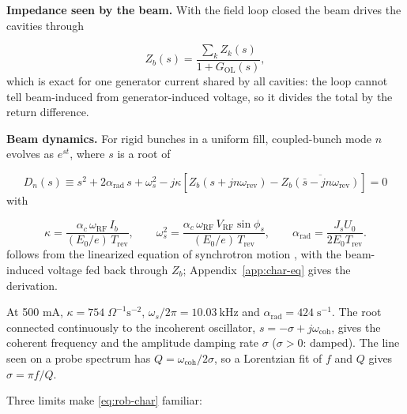 \textbf{Impedance seen by the beam.} With the field loop closed the beam drives the cavities through

\begin{equation}\label{eq:rob-zb}
Z_b(s) = \frac{\sum_k Z_k(s)}{1 + G_\text{OL}(s)},
\end{equation}
which is exact for one generator current shared by all cavities: the loop cannot tell beam-induced from generator-induced voltage, so it divides the total by the return difference.

\textbf{Beam dynamics.} For rigid bunches in a uniform fill, coupled-bunch mode \(n\) evolves as \(e^{st}\), where \(s\) is a root of

\begin{equation}\label{eq:rob-char}
D_n(s) \equiv s^2 + 2\alpha_\text{rad}\,s + \omega_s^2 - j\kappa\left[Z_b(s + jn\omega_\text{rev}) - \overline{Z_b(\bar s - jn\omega_\text{rev})}\right] = 0
\end{equation}
with

\begin{equation}\label{eq:rob-coeffs}
\kappa = \frac{\alpha_c\,\omega_\text{RF}\,I_b}{(E_0/e)\,T_\text{rev}},\qquad
\omega_s^2 = \frac{\alpha_c\,\omega_\text{RF}\,V_\text{RF}\sin\phi_s}{(E_0/e)\,T_\text{rev}},\qquad
\alpha_\text{rad} = \frac{J_s U_0}{2E_0 T_\text{rev}}.
\end{equation}
 follows from the linearized equation of synchrotron motion , with the beam-induced voltage fed back through \(Z_b\); Appendix~\ref{app:char-eq} gives the derivation.

At 500 mA, \(\kappa = 754\;\Omega^{-1}\text{s}^{-2}\), \(\omega_s/2\pi = \qty{10.03}{\kilo\hertz}\) and \(\alpha_\text{rad} = 424\;\text{s}^{-1}\). The root connected continuously to the incoherent oscillator, \(s = -\sigma + j\omega_\text{coh}\), gives the coherent frequency and the amplitude damping rate \(\sigma\) (\(\sigma > 0\): damped). The line seen on a probe spectrum has \(Q = \omega_\text{coh}/2\sigma\), so a Lorentzian fit of \(f\) and \(Q\) gives \(\sigma = \pi f/Q\).

Three limits make \cref{eq:rob-char} familiar:

